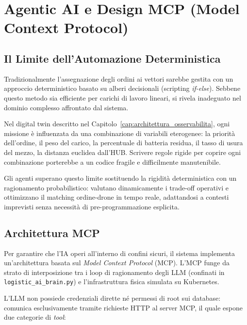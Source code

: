 
\chapter{Agentic AI e Design MCP (Model Context Protocol)}
\label{cap:agentic_operations_mcp}

\section{Il Limite dell'Automazione Deterministica}
\label{sec:limite_automazione}

Tradizionalmente l'assegnazione degli ordini ai vettori sarebbe gestita con un approccio deterministico basato su alberi decisionali (scripting \textit{if-else}). Sebbene questo metodo sia efficiente per carichi di lavoro lineari, si rivela inadeguato nel dominio complesso affrontato dal sistema.

Nel digital twin descritto nel Capitolo~\ref{cap:architettura_osservabilita}, ogni missione è influenzata da una combinazione di variabili eterogenee: la priorità dell'ordine, il peso del carico, la percentuale di batteria residua, il tasso di usura del mezzo, la distanza euclidea dall'HUB. Scrivere regole rigide per coprire ogni combinazione porterebbe a un codice fragile e difficilmente manutenibile.

Gli agenti superano questo limite sostituendo la rigidità deterministica con un ragionamento probabilistico: valutano dinamicamente i trade-off operativi e ottimizzano il matching ordine-drone in tempo reale, adattandosi a contesti imprevisti senza necessità di pre-programmazione esplicita.

\section{Architettura MCP}
\label{sec:architettura_mcp}

Per garantire che l'IA operi all'interno di confini sicuri, il sistema implementa un'architettura basata sul \textit{Model Context Protocol} (MCP). L'MCP funge da strato di interposizione tra i loop di ragionamento degli LLM (confinati in \texttt{logistic\_ai\_brain.py}) e l'infrastruttura fisica simulata su Kubernetes.

L'LLM non possiede credenziali dirette né permessi di root sui database: comunica esclusivamente tramite richieste HTTP al server MCP, il quale espone due categorie di \textit{tool}:

